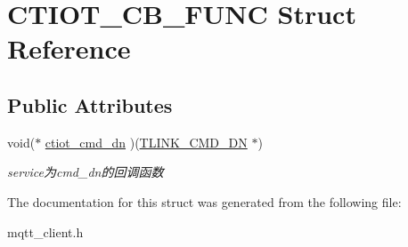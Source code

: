 \hypertarget{struct_c_t_i_o_t___c_b___f_u_n_c}{}\section{C\+T\+I\+O\+T\+\_\+\+C\+B\+\_\+\+F\+U\+NC Struct Reference}
\label{struct_c_t_i_o_t___c_b___f_u_n_c}
\subsection*{Public Attributes}
\begin{DoxyCompactItemize}
\item 
\mbox{\label{struct_c_t_i_o_t___c_b___f_u_n_c_af0baacea2650df8dbd45f8d64c49bf87}} 
void($\ast$ \mbox{\hyperlink{struct_c_t_i_o_t___c_b___f_u_n_c_af0baacea2650df8dbd45f8d64c49bf87}{ctiot\+\_\+cmd\+\_\+dn}} )(\mbox{\hyperlink{structtlink__cmd__dn}{T\+L\+I\+N\+K\+\_\+\+C\+M\+D\+\_\+\+DN}} $\ast$)
\begin{DoxyCompactList}\small\item\em service为cmd\+\_\+dn的回调函数 \end{DoxyCompactList}\end{DoxyCompactItemize}


The documentation for this struct was generated from the following file\+:\begin{DoxyCompactItemize}
\item 
mqtt\+\_\+client.\+h\end{DoxyCompactItemize}

